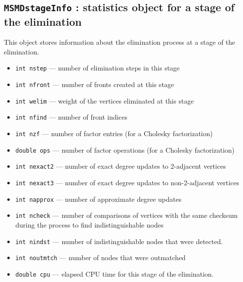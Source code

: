 \subsection{{\tt MSMDstageInfo} : statistics object for a stage of
the elimination}
\par
This object stores information about the elimination process at a
stage of the elimination.
\par
\begin{itemize}
\item
{\tt int nstep} --- number of elimination steps in this stage
\item
{\tt int nfront} --- number of fronts created at this stage
\item
{\tt int welim} --- weight of the vertices eliminated at this stage
\item
{\tt int nfind} --- number of front indices 
\item
{\tt int nzf} --- 
number of factor entries (for a Cholesky factorization)
\item
{\tt double ops} --- 
number of factor operations (for a Cholesky factorization)
\item
{\tt int nexact2} --- 
number of exact degree updates to 2-adjacent vertices
\item
{\tt int nexact3} --- number of exact degree updates 
to non-2-adjacent vertices
\item
{\tt int napprox} --- number of approximate degree updates
\item
{\tt int ncheck} --- number of comparisons of vertices with the same
checksum during the process to find indistinguishable nodes
\item
{\tt int nindst} --- number of indistinguishable nodes that were
detected.
\item
{\tt int noutmtch} --- number of nodes that were outmatched
\item
{\tt double cpu} --- elapsed CPU time for this stage of the elimination.
\end{itemize}
\par
\par
